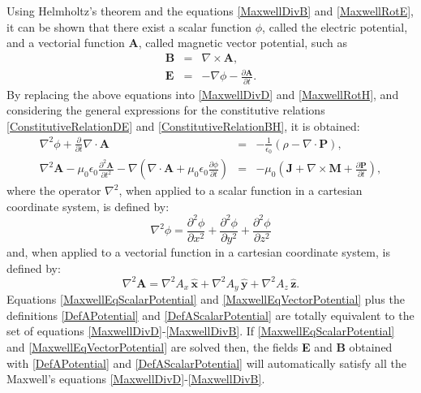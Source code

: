 Using Helmholtz's theorem and the equations \eqref{MaxwellDivB} and \eqref{MaxwellRotE}, it can be shown that there exist a scalar function $\phi$, called the electric potential, and a vectorial
function \textbf{A}, called magnetic vector potential, such as
\begin{eqnarray} 
    \mathbf{B} &=& \nabla\times\mathbf{A}, 
    \label{DefAPotential}
	\\
	\mathbf{E} &=& -\nabla\phi - \frac{\partial\mathbf{A}}{\partial t}.
	\label{DefAScalarPotential}
\end{eqnarray}
By replacing the above equations into \eqref{MaxwellDivD} and \eqref{MaxwellRotH}, and considering the general expressions for the constitutive relations \eqref{ConstitutiveRelationDE} and \eqref{ConstitutiveRelationBH}, it is obtained:
\begin{eqnarray} 
	\nabla^{2}\phi + \frac{\partial}{\partial t} \nabla\cdot\mathbf{A} &=& - \frac{1}{\epsilon_{0}} \left(\rho - \nabla\cdot\mathbf{P}\right),
	\label{MaxwellEqScalarPotential}
	\\
	\nabla^{2}\mathbf{A} - \mu_{0}\epsilon_{0}\frac{\partial^{2}\mathbf{A}}{\partial t^{2}} - \nabla\left(\nabla\cdot\mathbf{A} + \mu_{0}\epsilon_{0}\frac{\partial\phi}{\partial t}\right) &=& - \mu_{0}\left(\mathbf{J} + \nabla\times\mathbf{M} + \frac{\partial\mathbf{P}}{\partial t}\right),
	\label{MaxwellEqVectorPotential}
\end{eqnarray}
where the operator $\nabla^{2}$, when applied to a scalar function in a cartesian coordinate system, is defined by:
\begin{equation}\label{LaplaceOperatorScalar}
	\nabla^{2}\phi = \frac{\partial^{2}\phi}{\partial x^{2}} + \frac{\partial^{2}\phi}{\partial y^{2}} + \frac{\partial^{2}\phi}{\partial z^{2}}
\end{equation}
and, when applied to a vectorial function in a cartesian coordinate system, is defined by:
\begin{equation}\label{LaplaceOperatorVectorial}
	\nabla^{2}\mathbf{A} = \nabla^{2}A_{x}\,\mathbf{\hat{x}} + \nabla^{2}A_{y}\,\mathbf{\hat{y}} + \nabla^{2}A_{z}\,\mathbf{\hat{z}}.
\end{equation}
Equations \eqref{MaxwellEqScalarPotential} and \eqref{MaxwellEqVectorPotential} plus the definitions \eqref{DefAPotential} and \eqref{DefAScalarPotential} are totally equivalent to the set of equations \eqref{MaxwellDivD}-\eqref{MaxwellDivB}. If \eqref{MaxwellEqScalarPotential} and \eqref{MaxwellEqVectorPotential} are solved then, the fields \textbf{E} and
\textbf{B} obtained with \eqref{DefAPotential} and \eqref{DefAScalarPotential} will automatically satisfy all the Maxwell's equations \eqref{MaxwellDivD}-\eqref{MaxwellDivB}.

